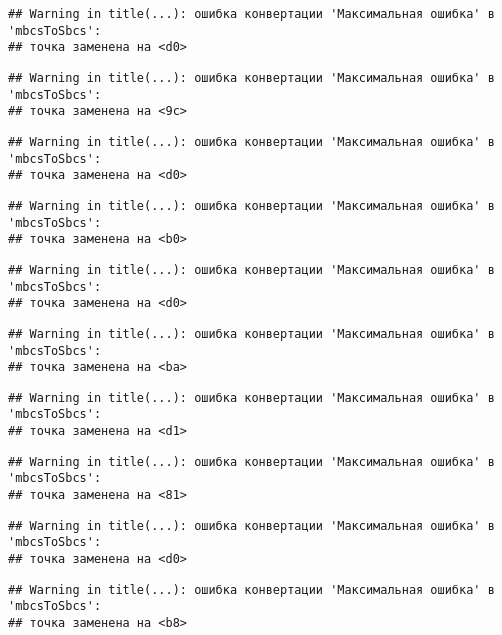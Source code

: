 \documentclass[
]{article}
\begin{document}
\begin{verbatim}
## Warning in title(...): ошибка конвертации 'Максимальная ошибка' в 'mbcsToSbcs':
## точка заменена на <d0>
\end{verbatim}

\begin{verbatim}
## Warning in title(...): ошибка конвертации 'Максимальная ошибка' в 'mbcsToSbcs':
## точка заменена на <9c>
\end{verbatim}

\begin{verbatim}
## Warning in title(...): ошибка конвертации 'Максимальная ошибка' в 'mbcsToSbcs':
## точка заменена на <d0>
\end{verbatim}

\begin{verbatim}
## Warning in title(...): ошибка конвертации 'Максимальная ошибка' в 'mbcsToSbcs':
## точка заменена на <b0>
\end{verbatim}

\begin{verbatim}
## Warning in title(...): ошибка конвертации 'Максимальная ошибка' в 'mbcsToSbcs':
## точка заменена на <d0>
\end{verbatim}

\begin{verbatim}
## Warning in title(...): ошибка конвертации 'Максимальная ошибка' в 'mbcsToSbcs':
## точка заменена на <ba>
\end{verbatim}

\begin{verbatim}
## Warning in title(...): ошибка конвертации 'Максимальная ошибка' в 'mbcsToSbcs':
## точка заменена на <d1>
\end{verbatim}

\begin{verbatim}
## Warning in title(...): ошибка конвертации 'Максимальная ошибка' в 'mbcsToSbcs':
## точка заменена на <81>
\end{verbatim}

\begin{verbatim}
## Warning in title(...): ошибка конвертации 'Максимальная ошибка' в 'mbcsToSbcs':
## точка заменена на <d0>
\end{verbatim}

\begin{verbatim}
## Warning in title(...): ошибка конвертации 'Максимальная ошибка' в 'mbcsToSbcs':
## точка заменена на <b8>
\end{verbatim}
\end{document}
